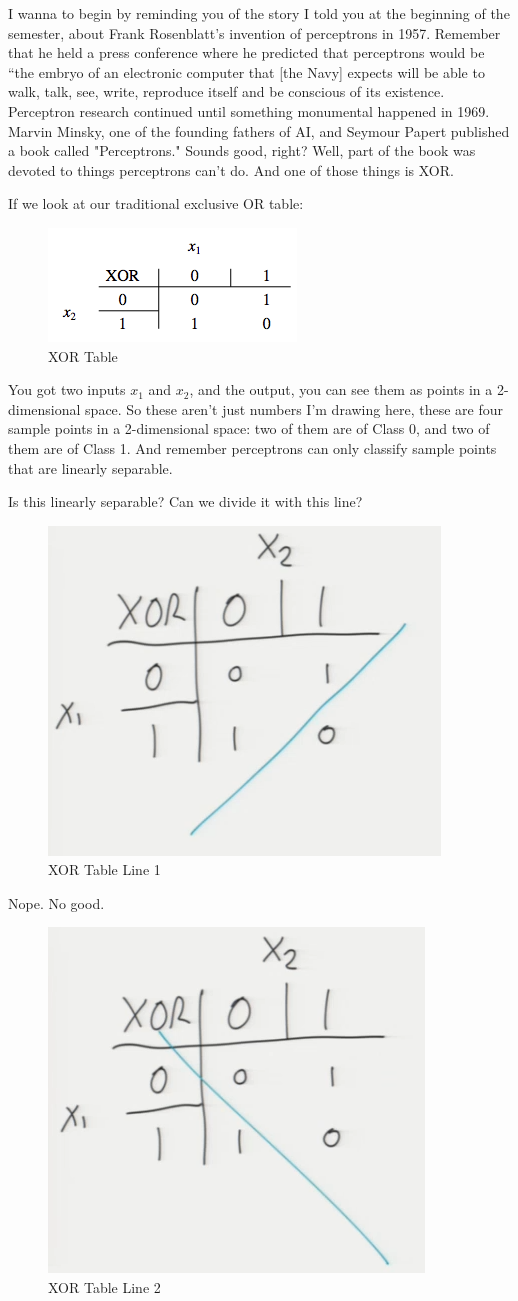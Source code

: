 \documentclass[fleqn,10pt]{olplainarticle}
\theoremstyle{definition}
\theoremstyle{remark}
\begin{document}
I wanna to begin by reminding you of the story I told you at the beginning of the semester, about Frank Rosenblatt’s invention of perceptrons in 1957. Remember that he held a press conference where he predicted that perceptrons would be “the embryo of an electronic computer that [the Navy] expects will be able to walk, talk, see, write, reproduce itself and be conscious of its existence. Perceptron research continued until something monumental happened in 1969. Marvin Minsky, one of the founding fathers of AI, and Seymour Papert published a book called "Perceptrons." Sounds good, right? Well, part of the book was devoted to things perceptrons can’t do. And one of those things is XOR.

If we look at our traditional exclusive OR table:

\begin{figure}[ht]
\centering
\includegraphics[width=0.3\linewidth]{images/XOR}
\caption{XOR Table}
\label{fig:XOR Table}
\end{figure}

You got two inputs $x_1$ and $x_2$, and the output, you can see them as points in a 2-dimensional space. So these aren't just numbers I'm drawing here, these are four sample points in a 2-dimensional space: two of them are of Class 0, and two of them are of Class 1. And remember perceptrons can only classify sample points that are linearly separable. 

Is this linearly separable? Can we divide it with this line?
\begin{figure}[ht]
\centering
\includegraphics[width=0.25\linewidth]{images/XOR_1}
\caption{XOR Table Line 1}
\label{fig:XOR_Table_Line_1}
\end{figure}

Nope. No good. 
\begin{figure}[ht]
\centering
\includegraphics[width=0.25\linewidth]{images/XOR_2}
\caption{XOR Table Line 2}
\label{fig:XOR_Table_Line_2}
\end{figure}
\end{document}
